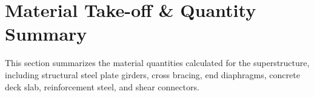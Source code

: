 \documentclass[12pt,a4paper]{report}
\numberwithin{table}{chapter}
\numberwithin{figure}{chapter}
\begin{document}
\noindent
\begin{minipage}[t]{0.31\textwidth}
\centering
{}
\label{fig:ed-bracing-sec}
\end{minipage}
\hfill
\begin{minipage}[t]{0.31\textwidth}
\centering
{}
\label{fig:ed-top-chord}
\end{minipage}
\hfill
\begin{minipage}[t]{0.31\textwidth}
\centering
{}
\label{fig:ed-bottom-chord}
\end{minipage}



\chapter{Material Take-off \& Quantity Summary}
\label{ch:material-takeoff}

This section summarizes the material quantities calculated for the superstructure, including structural steel plate girders, cross bracing, end diaphragms, concrete deck slab, reinforcement steel, and shear connectors.
\end{document}
